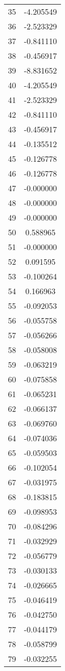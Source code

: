 \documentclass[12pt]{article}
\begin{document}
\begin{longtable}{@{}cc@{}}
35 & -4.205549 \\
36 & -2.523329 \\
37 & -0.841110 \\
38 & -0.456917 \\
39 & -8.831652 \\
40 & -4.205549 \\
41 & -2.523329 \\
42 & -0.841110 \\
43 & -0.456917 \\
44 & -0.135512 \\
45 & -0.126778 \\
46 & -0.126778 \\
47 & -0.000000 \\
48 & -0.000000 \\
49 & -0.000000 \\
50 & 0.588965 \\
51 & -0.000000 \\
52 & 0.091595 \\
53 & -0.100264 \\
54 & 0.166963 \\
55 & -0.092053 \\
56 & -0.055758 \\
57 & -0.056266 \\
58 & -0.058008 \\
59 & -0.063219 \\
60 & -0.075858 \\
61 & -0.065231 \\
62 & -0.066137 \\
63 & -0.069760 \\
64 & -0.074036 \\
65 & -0.059503 \\
66 & -0.102054 \\
67 & -0.031975 \\
68 & -0.183815 \\
69 & -0.098953 \\
70 & -0.084296 \\
71 & -0.032929 \\
72 & -0.056779 \\
73 & -0.030133 \\
74 & -0.026665 \\
75 & -0.046419 \\
76 & -0.042750 \\
77 & -0.044179 \\
78 & -0.058799 \\
79 & -0.032255 \\

\end{longtable}
\end{document}
